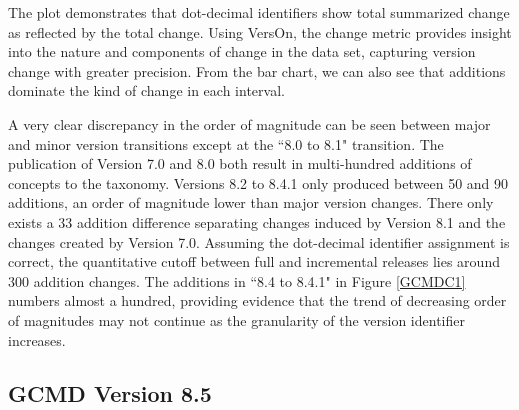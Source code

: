 The plot demonstrates that dot-decimal identifiers show total summarized change as reflected by the total change.
Using VersOn, the change metric provides insight into the nature and components of change in the data set, capturing version change with greater precision.
From the bar chart, we can also see that additions dominate the kind of change in each interval.

A very clear discrepancy in the order of magnitude can be seen between major and minor version transitions except at the ``8.0 to 8.1" transition.
The publication of Version 7.0 and 8.0 both result in multi-hundred additions of concepts to the taxonomy.
Versions 8.2 to 8.4.1 only produced between 50 and 90 additions, an order of magnitude lower than major version changes.
There only exists a 33 addition difference separating changes induced by Version 8.1 and the changes created by Version 7.0.
Assuming the dot-decimal identifier assignment is correct, the quantitative cutoff between full and incremental releases lies around 300 addition changes.
The additions in ``8.4 to 8.4.1" in Figure \ref{GCMDC1} numbers almost a hundred, providing evidence that the trend of decreasing order of magnitudes may not continue as the granularity of the version identifier increases.



\subsection{GCMD Version 8.5} \label{sec:85}

